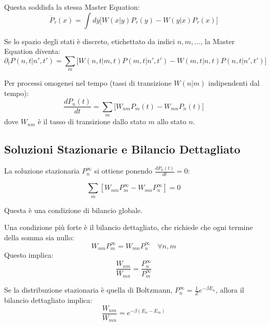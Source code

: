 Questa soddisfa la stessa Master Equation:
\begin{equation}
\dot{P}_{\tau}(x) = \int dy \biggl[W(x|y)P_{\tau}(y) - W(y|x)P_{\tau}(x)\biggr]
\end{equation}

Se lo spazio degli stati è discreto, etichettato da indici $n, m, \dots$, la Master Equation diventa:
\begin{equation*}
\partial_t P(n,t|n',t') = \sum_m \biggl[W(n,t|m,t)P(m,t|n',t') - W(m,t|n,t)P(n,t|n',t')\biggr]
\end{equation*}

Per processi omogenei nel tempo (tassi di transizione $W(n|m)$ indipendenti dal tempo):
\begin{equation}
\frac{dP_n(t)}{dt} = \sum_m \biggl[W_{nm}P_m(t) - W_{mn}P_n(t)\biggr]
\label{eq:master_discrete}
\end{equation}
dove $W_{nm}$ è il tasso di transizione dallo stato $m$ allo stato $n$.

\subsection{Soluzioni Stazionarie e Bilancio Dettagliato}
La soluzione stazionaria $P_n^{\infty}$ si ottiene ponendo $\frac{dP_n(t)}{dt} = 0$:
\begin{tcolorbox}[
    colback=colorA!5,      
    colframe=colorA,       
    arc=3mm,               
    boxrule=1.2pt
]
\begin{equation}
\sum_m [W_{nm}P_m^{\infty} - W_{mn}P_n^{\infty}] = 0
\end{equation}
\end{tcolorbox}
Questa è una condizione di bilancio globale.

Una condizione più forte è il bilancio dettagliato, che richiede che ogni termine della somma sia nullo:
\begin{equation}
W_{nm}P_m^{\infty} = W_{mn}P_n^{\infty} \quad \forall n,m
\end{equation}
Questo implica:
\begin{equation}
\frac{W_{nm}}{W_{mn}} = \frac{P_n^{\infty}}{P_m^{\infty}}
\end{equation}

Se la distribuzione stazionaria è quella di Boltzmann, $P_n^{\infty} = \frac{1}{Z} e^{-\beta E_n}$, allora il bilancio dettagliato implica:
\begin{equation} 
\frac{W_{nm}}{W_{mn}} = e^{-\beta(E_n - E_m)} 
\end{equation}

